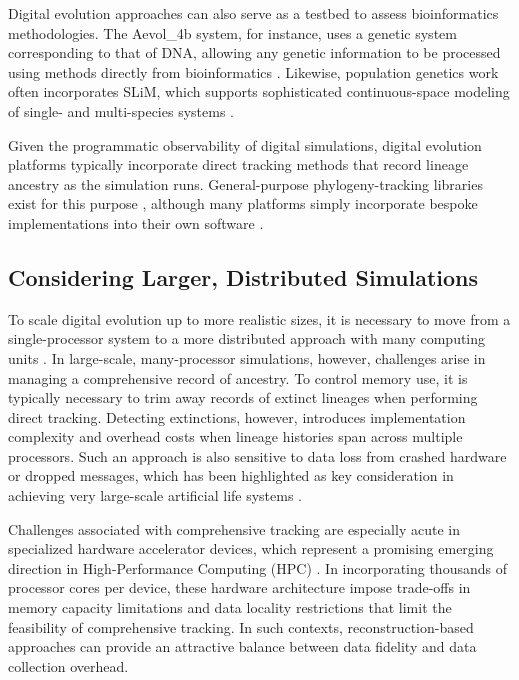 Digital evolution approaches can also serve as a testbed to assess bioinformatics methodologies.
The Aevol\_4b system, for instance, uses a genetic system corresponding to that of DNA, allowing any genetic information to be processed using methods directly from bioinformatics \citep{daudey2024aevol}.
Likewise, population genetics work often incorporates SLiM, which supports sophisticated continuous-space modeling of single- and multi-species systems \citep{haller2023slim}.

Given the programmatic observability of digital simulations, digital evolution platforms typically incorporate direct tracking methods that record lineage ancestry as the simulation runs.
General-purpose phylogeny-tracking libraries exist for this purpose \citep{dolson2024phylotrack}, although many platforms simply incorporate bespoke implementations into their own software \citep{ofria2004avida}.

\subsection{Considering Larger, Distributed Simulations} \label{sec:introduction:distributed}


To scale digital evolution up to more realistic sizes, it is necessary to move from a single-processor system to a more distributed approach with many computing units \citep{moreno2024trackable}.
In large-scale, many-processor simulations, however, challenges arise in managing a comprehensive record of ancestry.
To control memory use, it is typically necessary to trim away records of extinct lineages when performing direct tracking.
Detecting extinctions, however, introduces implementation complexity and overhead costs when lineage histories span across multiple processors.
Such an approach is also sensitive to data loss from crashed hardware or dropped messages, which has been highlighted as key consideration in achieving very large-scale artificial life systems \citep{ackley2016indefinite,ackley2014indefinitely}.

Challenges associated with comprehensive tracking are especially acute in specialized hardware accelerator devices, which represent a promising emerging direction in High-Performance Computing (HPC) \citep{emani2024democratizing}.
In incorporating thousands of processor cores per device, these hardware architecture impose trade-offs in memory capacity limitations and data locality restrictions that limit the feasibility of comprehensive tracking.
In such contexts, reconstruction-based approaches can provide an attractive balance between data fidelity and data collection overhead.

